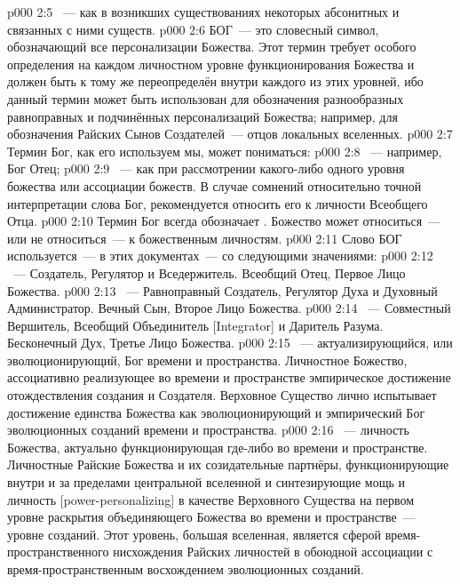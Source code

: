 \vs p000 2:5 ~--- как в возникших существованиях некоторых абсонитных и связанных с ними существ.
\vs p000 2:6 БОГ~--- это словесный символ, обозначающий все персонализации Божества. Этот термин требует особого определения на каждом личностном уровне функционирования Божества и должен быть к тому же переопределён внутри каждого из этих уровней, ибо данный термин может быть использован для обозначения разнообразных равноправных и подчинённых персонализаций Божества; например, для обозначения Райских Сынов Создателей~--- отцов локальных вселенных.
\vs p000 2:7 \pc Термин Бог, как его используем мы, может пониматься:
\vs p000 2:8 ~--- например, Бог Отец;
\vs p000 2:9 ~--- как при рассмотрении какого\hyp{}либо одного уровня божества или ассоциации божеств. В случае сомнений относительно точной интерпретации слова Бог, рекомендуется относить его к личности Всеобщего Отца.
\vs p000 2:10 \pc Термин Бог всегда обозначает . Божество может относиться~--- или не относиться~--- к божественным личностям.
\vs p000 2:11 \pc Слово БОГ используется~--- в этих документах~--- со следующими значениями:
\vs p000 2:12 ~--- Создатель, Регулятор и Вседержитель. Всеобщий Отец, Первое Лицо Божества.
\vs p000 2:13 ~--- Равноправный Создатель, Регулятор Духа и Духовный Администратор. Вечный Сын, Второе Лицо Божества.
\vs p000 2:14 ~--- Совместный Вершитель, Всеобщий Объединитель [Integrator] и Даритель Разума. Бесконечный Дух, Третье Лицо Божества.
\vs p000 2:15 ~--- актуализирующийся, или эволюционирующий, Бог времени и пространства. Личностное Божество, ассоциативно реализующее во времени и пространстве эмпирическое достижение отождествления создания и Создателя. Верховное Существо лично испытывает достижение единства Божества как эволюционирующий и эмпирический Бог эволюционных созданий времени и пространства.
\vs p000 2:16 ~--- личность Божества, актуально функционирующая где\hyp{}либо во времени и пространстве. Личностные Райские Божества и их созидательные партнёры, функционирующие внутри и за пределами центральной вселенной и синтезирующие мощь и личность [power\hyp{}personalizing] в качестве Верховного Существа на первом уровне раскрытия объединяющего Божества во времени и пространстве~--- уровне созданий. Этот уровень, большая вселенная, является сферой время\hyp{}пространственного нисхождения Райских личностей в обоюдной ассоциации с время\hyp{}пространственным восхождением эволюционных созданий.
